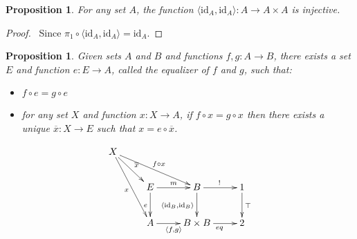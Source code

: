 \documentclass{book}
\let\qed\relax
\newtheorem{prop}[ax]{Proposition}
\theoremstyle{definition}
\newcommand{\id}[1]{\ensuremath{\mathrm{id}_{#1}}}
\begin{document}
\begin{prop}
For any set $A$, the function $\langle \id{A}, \id{A} \rangle : A \rightarrow A \times A$ is injective.
\end{prop}

\begin{proof}
\pf\ Since $\pi_1 \circ \langle \id{A}, \id{A} \rangle = \id{A}$. \qed
\end{proof}

\begin{prop}
Given sets $A$ and $B$ and functions $f,g : A \rightarrow B$, there exists a set $E$ and function $e : E \rightarrow A$, called the \emph{equalizer} of $f$ and $g$, such that:
\begin{itemize}
\item $f \circ e = g \circ e$
\item for any set $X$ and function $x : X \rightarrow A$, if $f \circ x = g \circ x$ then there exists a unique $\overline{x} : X \rightarrow E$ such that $x = e \circ \overline{x}$.
\end{itemize}
\end{prop}

\[ \xymatrix{
X \ar[ddr]_x \ar[drr]^{f \circ x} \ar[dr]^{\overline{x}} \\
& E \ar[d]_e \ar[r]^m & B \ar[d]_{\langle \id{B}, \id{B} \rangle} \ar[r]^{!} & 1 \ar[d]^{\top} \\
& A \ar[r]_{\langle f,g \rangle} & B \times B \ar[r]_{eq} & 2
} \]
\end{document}
